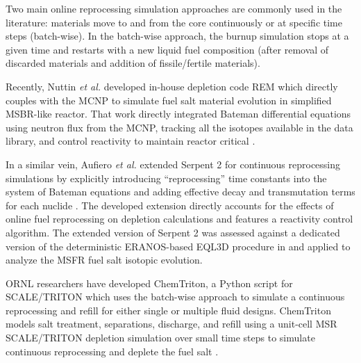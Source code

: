 Two main online reprocessing simulation approaches are commonly used in the 
literature: materials move to and from the core continuously or at specific 
time steps (batch-wise). In the batch-wise approach, the burnup simulation 
stops at a given time and restarts with a new liquid fuel composition 
(after removal of discarded materials and addition of fissile/fertile 
materials).

Recently, Nuttin \emph{et al.} developed in-house 
depletion code REM which directly couples with the \gls{MCNP}  
\cite{noauthor_mcnp_2004} to simulate fuel salt material evolution in 
simplified \gls{MSBR}-like reactor. That work directly integrated
Bateman differential equations using neutron flux from the \gls{MCNP}, 
tracking all the isotopes available in the data library, and control 
reactivity to maintain reactor critical \cite{nuttin_potential_2005}.

In a similar vein, Aufiero \emph{et al.} extended Serpent 2 for continuous 
reprocessing simulations by explicitly introducing ``reprocessing'' time 
constants into the system of Bateman equations and adding effective decay and 
transmutation terms for each nuclide \cite{aufiero_extended_2013}. The 
developed extension directly accounts for the effects of online fuel 
reprocessing on depletion calculations and features a reactivity control 
algorithm. The extended version of Serpent 2 was assessed against a dedicated 
version of the deterministic ERANOS-based EQL3D procedure in 
\cite{fiorina_investigation_2013} and applied to analyze the \gls{MSFR} fuel 
salt isotopic evolution.

\gls{ORNL} researchers have developed ChemTriton, a Python script for
SCALE/TRITON which uses the batch-wise approach to simulate a continuous 
reprocessing and refill for either single or multiple fluid designs. 
ChemTriton models salt treatment, separations, discharge, and refill using a 
unit-cell MSR SCALE/TRITON depletion simulation over small time steps to 
simulate continuous reprocessing and deplete the fuel salt 
\cite{powers_new_2013, betzler_fuel_2018}.

